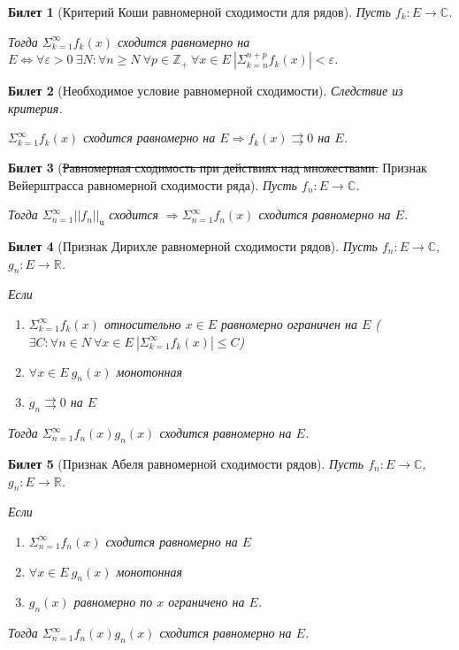\documentclass[11pt,a4paper,oneside]{scrartcl}
\newtheorem{ticket}{Билет}
\begin{document}
\addtocounter{ticket}{-1}
\begin{ticket}[Критерий Коши равномерной сходимости для рядов]
    Пусть $f_k: E \rightarrow \mathbb{C}$.

    Тогда $\Sigma_{k=1}^\infty f_k(x)$ сходится равномерно на $E \Leftrightarrow
    \forall \varepsilon > 0 \ \exists N : \forall n \geq N \
    \forall p \in \mathbb{Z_+} \ \forall x \in E \ |\Sigma_{k=n}^{n+p} f_k(x)| < \varepsilon$.
\end{ticket}

\addtocounter{ticket}{-1}
\begin{ticket}[Необходимое условие равномерной сходимости]
    Следствие из критерия.

    $\Sigma_{k=1}^\infty f_k(x)$ сходится равномерно на $E \Rightarrow
    f_k(x) \rightrightarrows 0$ на $E$.
\end{ticket}

\begin{ticket}[\sout{Равномерная сходимость при действиях над множествами.}
        Признак Вейерштрасса равномерной сходимости ряда]
    Пусть ${f_n}: E \rightarrow \mathbb{C}$.

    Тогда $\Sigma_{n=1}^\infty ||f_n||_{\text{ч}}$ сходится $\Rightarrow
    \Sigma_{n=1}^\infty f_n(x)$ сходится равномерно на $E$.
\end{ticket}

\begin{ticket}[Признак Дирихле равномерной сходимости рядов]
    Пусть ${f_n}: E \rightarrow \mathbb{C}$, ${g_n}: E \rightarrow \mathbb{R}$.

    Если
    \begin{enumerate}
        \item ${\Sigma_{k=1}^\infty f_k(x)}$ относительно $x \in E$ равномерно
            ограничен на $E$ ($\exists C: \forall n \in N \ \forall x \in E \
            |\Sigma_{k=1}^\infty f_k(x)| \leq C$)
        \item $\forall x \in E \ {g_n(x)}$ монотонная
        \item $g_n \rightrightarrows 0$ на $E$
    \end{enumerate}

    Тогда $\Sigma_{n=1}^\infty f_n(x) g_n(x)$ сходится равномерно на $E$.
\end{ticket}

\addtocounter{ticket}{-1}
\begin{ticket}[Признак Абеля равномерной сходимости рядов]
    Пусть ${f_n}: E \rightarrow \mathbb{C}$, ${g_n}: E \rightarrow \mathbb{R}$.

    Если
    \begin{enumerate}
        \item $\Sigma_{n=1}^\infty f_n(x)$ сходится равномерно на $E$
        \item $\forall x \in E \ {g_n(x)}$ монотонная
        \item ${g_n(x)}$ равномерно по $x$ ограничено на $E$.
    \end{enumerate}

    Тогда $\Sigma_{n=1}^\infty f_n(x) g_n(x)$ сходится равномерно на $E$.
\end{ticket}
\end{document}
